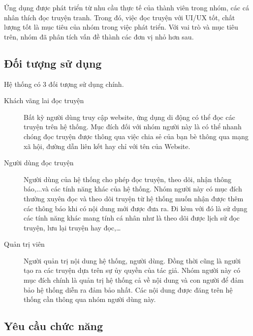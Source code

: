\documentclass[./../main.tex]{subfiles}
\begin{document}
Ứng dụng được phát triển từ nhu cầu thực tế của thành viên trong nhóm, các cá nhân thích đọc truyện tranh. Trong đó, việc đọc truyện với UI/UX tốt, chất lượng tốt là mục tiêu của nhóm trong việc phát triển. Với vai trò và mục tiêu trên, nhóm đã phân tích vấn đề thành các đơn vị nhỏ hơn sau.

\subsection{Đối tượng sử dụng}

Hệ thống có 3 đối tượng sử dụng chính.

\begin{description}
	\item[Khách vãng lai đọc truyện] Bất kỳ người dùng truy cập website, ứng dụng di động có thể đọc các truyện trên hệ thống. Mục đích đối với nhóm người này là có thể nhanh chóng đọc truyện được thông qua việc chia sẻ của bạn bè thông qua mạng xã hội, đường dẫn liên kết hay chỉ với tên của Website.
	\item[Người dùng đọc truyện] Người dùng của hệ thống cho phép đọc truyện, theo dõi, nhận thông báo,...và các tính năng khác của hệ thống. Nhóm người này có mục đích thường xuyên đọc và theo dõi truyện từ  hệ thống muốn nhận được thêm các thông báo khi có nội dung mới được đưa ra. Đi kèm với đó là sử dụng các tính năng khác mang tính cá nhân như là theo dõi được lịch sử đọc truyện, lưu lại truyện hay đọc,…
	\item[Quản trị viên] Người quản trị nội dung hệ thống, người dùng. Đồng thời cũng là người tạo ra các truyện dựa trên sự ủy quyền của tác giả. Nhóm người này có mục đích chính là quản trị hệ thống cả về nội dung và con người để đảm bảo hệ thống diễn ra đảm bảo nhất. Các nội dung được đăng trên hệ thống cần thông qua nhóm người dùng này.
\end{description}

\subsection{Yêu cầu chức năng}
\end{document}
